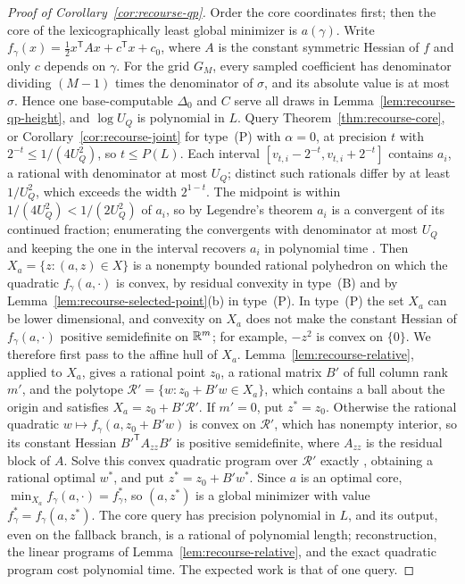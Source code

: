 \begin{proof}[Proof of Corollary~\ref{cor:recourse-qp}]
Order the core coordinates first; then the core of the lexicographically
least global minimizer is $a(\gamma)$. Write
$f_\gamma(x)=\frac12x^{\mathsf T}Ax+c^{\mathsf T}x+c_0$, where $A$ is the
constant symmetric Hessian of $f$ and only $c$ depends on $\gamma$. For
the grid $G_M$, every sampled coefficient has denominator dividing
$(M-1)$ times the denominator of $\sigma$, and its absolute value is at
most $\sigma$. Hence one base-computable $\Delta_0$ and $C$ serve all
draws in Lemma~\ref{lem:recourse-qp-height}, and $\log U_Q$ is
polynomial in $L$. Query Theorem~\ref{thm:recourse-core}, or
Corollary~\ref{cor:recourse-joint} for type~(P) with $\alpha=0$, at
precision $t$ with $2^{-t}\le1/(4U_Q^2)$, so $t\le P(L)$. Each interval
$[v_{t,i}-2^{-t},v_{t,i}+2^{-t}]$ contains $a_i$, a rational with
denominator at most $U_Q$; distinct such rationals differ by at least
$1/U_Q^2$, which exceeds the width $2^{1-t}$. The midpoint is within
$1/(4U_Q^2)<1/(2U_Q^2)$ of $a_i$, so by Legendre's theorem $a_i$ is a
convergent of its continued fraction; enumerating the convergents with
denominator at most $U_Q$ and keeping the one in the interval recovers
$a_i$ in polynomial time \citep{Schrijver1986}. Then
$X_a=\{z:(a,z)\in X\}$ is a nonempty bounded rational polyhedron on
which the quadratic $f_\gamma(a,\cdot)$ is convex, by residual convexity
in type~(B) and by Lemma~\ref{lem:recourse-selected-point}(b) in
type~(P). In type~(P) the set $X_a$ can be lower dimensional, and
convexity on $X_a$ does not make the constant Hessian of
$f_\gamma(a,\cdot)$ positive semidefinite on $\mathbb R^m$; for example, $-z^2$
is convex on $\{0\}$. We therefore first pass to the affine hull of
$X_a$. Lemma~\ref{lem:recourse-relative}, applied to $X_a$, gives a
rational point $z_0$, a rational matrix $B'$ of full column rank $m'$,
and the polytope $\mathcal R'=\{w:z_0+B'w\in X_a\}$, which contains a
ball about the origin and satisfies $X_a=z_0+B'\mathcal R'$. If $m'=0$,
put $z^*=z_0$. Otherwise the rational quadratic
$w\mapsto f_\gamma(a,z_0+B'w)$ is convex on $\mathcal R'$, which has
nonempty interior, so its constant Hessian $B'^{\mathsf T}A_{zz}B'$ is
positive semidefinite, where $A_{zz}$ is the residual block of $A$.
Solve this convex quadratic program over $\mathcal R'$ exactly
\citep{KozlovTarasovKhachiyan1980}, obtaining a rational optimal $w^*$,
and put $z^*=z_0+B'w^*$. Since $a$ is an optimal core,
$\min_{X_a}f_\gamma(a,\cdot)=f_\gamma^*$, so $(a,z^*)$ is a global
minimizer with value $f_\gamma^*=f_\gamma(a,z^*)$. The core query has
precision polynomial in $L$, and its output, even on the fallback
branch, is a rational of polynomial length; reconstruction, the linear
programs of Lemma~\ref{lem:recourse-relative}, and the exact quadratic
program cost polynomial time. The expected work is that of one query.
\end{proof}


